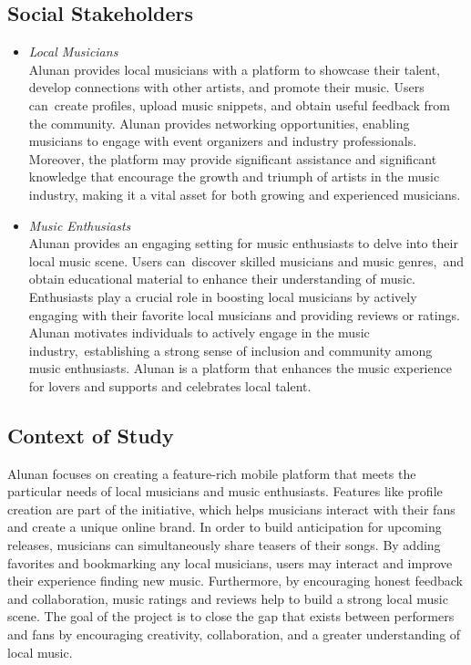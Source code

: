 \subsection{Social Stakeholders}
\begin{itemize}
    \item \textit{Local Musicians}\\
    Alunan provides local musicians with a platform to showcase their talent, develop connections with other artists, and promote their music. Users can create profiles, upload music snippets, and obtain useful feedback from the community. Alunan provides networking opportunities, enabling musicians to engage with event organizers and industry professionals. Moreover, the platform may provide significant assistance and significant knowledge that encourage the growth and triumph of artists in the music industry, making it a vital asset for both growing and experienced musicians.
    \item \textit{Music Enthusiasts}\\
    Alunan provides an engaging setting for music enthusiasts to delve into their local music scene. Users can discover skilled musicians and music genres, and obtain educational material to enhance their understanding of music. Enthusiasts play a crucial role in boosting local musicians by actively engaging with their favorite local musicians and providing reviews or ratings. Alunan motivates individuals to actively engage in the music industry, establishing a strong sense of inclusion and community among music enthusiasts. Alunan is a platform that enhances the music experience for lovers and supports and celebrates local talent.
\end{itemize}

\subsection{Context of Study}
Alunan focuses on creating a feature-rich mobile platform that meets the particular needs of local musicians and music enthusiasts. Features like profile creation are part of the initiative, which helps musicians interact with their fans and create a unique online brand. In order to build anticipation for upcoming releases, musicians can simultaneously share teasers of their songs. By adding favorites and bookmarking any local musicians, users may interact and improve their experience finding new music. Furthermore, by encouraging honest feedback and collaboration, music ratings and reviews help to build a strong local music scene. The goal of the project is to close the gap that exists between performers and fans by encouraging creativity, collaboration, and a greater understanding of local music. \\

